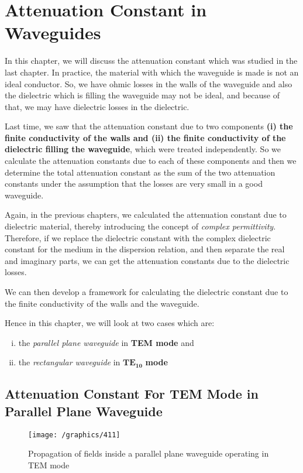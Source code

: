 \chapter{Attenuation Constant in Waveguides}\label{lec:lec42}
In this chapter, we will discuss the attenuation constant which was studied in the last chapter. In practice, the material with which the waveguide is made is not an ideal conductor. So, we have ohmic losses in the walls of the waveguide and also the dielectric which is filling the waveguide may not be ideal, and because of that, we may have dielectric losses in the dielectric.

Last time, we saw that the attenuation constant due to two components \textbf{(i) the finite conductivity of the walls and (ii) the finite conductivity of the dielectric filling the waveguide}, which were treated independently. So we calculate the attenuation constants due to each of these components and then we determine the total attenuation constant as the sum of the two attenuation constants under the assumption that the losses are very small in a good waveguide.

Again, in the previous chapters, we calculated the attenuation constant due to dielectric material, thereby introducing the concept of \emph{complex permittivity}. Therefore, if we replace the dielectric constant with the complex dielectric constant for the medium in the dispersion relation, and then separate the real and imaginary parts, we can get the attenuation constants due to the dielectric losses.

We can then develop a framework for calculating the dielectric constant due to the finite conductivity of the walls and the waveguide.

Hence in this chapter, we will look at two cases which are:
\begin{enumerate}[(i)]
\item the \emph{parallel plane waveguide} in \textbf{TEM mode} and
\item the \emph{rectangular waveguide} in $\boldsymbol{\text{TE}_{10}}$ \textbf{mode}
\end{enumerate}

\section{Attenuation Constant For TEM Mode in Parallel Plane Waveguide}
\begin{figure}[h]
\centering
\texttt{[image: /graphics/411]}
\caption{Propagation of fields inside a parallel plane waveguide operating in TEM mode}
\label{fig:elcture2imageb}
\end{figure}

